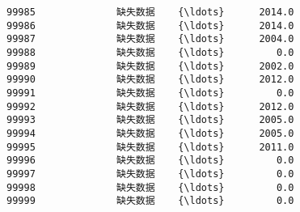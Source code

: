 \documentclass[11pt]{article}
\begin{document}
\begin{Verbatim}[commandchars=\\\{\}]
99985              缺失数据    {\ldots}      2014.0   
99986              缺失数据    {\ldots}      2014.0   
99987              缺失数据    {\ldots}      2004.0   
99988              缺失数据    {\ldots}         0.0   
99989              缺失数据    {\ldots}      2002.0   
99990              缺失数据    {\ldots}      2012.0   
99991              缺失数据    {\ldots}         0.0   
99992              缺失数据    {\ldots}      2012.0   
99993              缺失数据    {\ldots}      2005.0   
99994              缺失数据    {\ldots}      2005.0   
99995              缺失数据    {\ldots}      2011.0   
99996              缺失数据    {\ldots}         0.0   
99997              缺失数据    {\ldots}         0.0   
99998              缺失数据    {\ldots}         0.0   
99999              缺失数据    {\ldots}         0.0   


\end{Verbatim}
\end{document}
